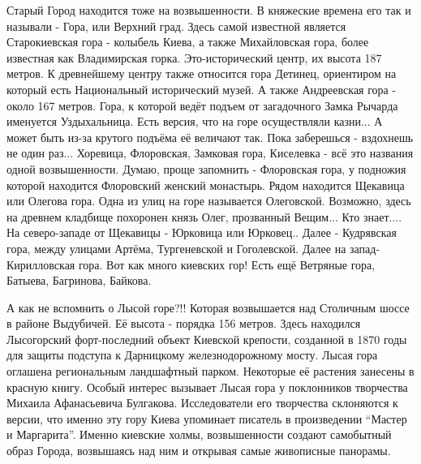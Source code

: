 




Старый Город находится тоже на возвышенности. В
княжеские времена его так и называли - Гора, или Верхний град. Здесь самой
известной является Старокиевская гора - колыбель Киева, а также Михайловская
гора, более известная как Владимирская горка. Это-исторический центр, их высота
187 метров. К древнейшему центру также относится гора Детинец, ориентиром на
который есть Национальный исторический музей. А также Андреевская гора - около 167
метров. Гора, к которой ведёт подъем от загадочного Замка Рычарда именуется
Уздыхальница. Есть версия, что на горе осуществляли казни... А может быть из-за
крутого подъёма её величают так. Пока заберешься - вздохнешь не один
раз... Хоревица, Флоровская, Замковая гора, Киселевка - всё это названия одной
возвышенности. Думаю, проще запомнить - Флоровская гора, у подножия которой
находится Флоровский  женский монастырь. Рядом находится Щекавица или Олегова
гора. Одна из улиц на горе называется Олеговской. Возможно, здесь на древнем
кладбище похоронен князь Олег, прозванный Вещим... Кто знает.... На северо-западе
от Щекавицы - Юрковица или Юрковец.. Далее - Кудрявская гора, между улицами
Артёма, Тургеневской и Гоголевской. Далее на запад-Кирилловская гора. Вот как
много киевских гор! Есть ещё Ветряные гора, Батыева, Багринова, Байкова. 

А как не вспомнить о Лысой горе?!! Которая возвышается над Столичным шоссе в
районе Выдубичей. Её высота - порядка 156 метров. Здесь находился Лысогорский
форт-последний объект Киевской крепости, созданной в 1870 годы для защиты
подступа к Дарницкому железнодорожному мосту. Лысая гора оглашена региональным
ландшафтный парком. Некоторые её растения занесены в красную книгу. Особый
интерес вызывает Лысая гора у поклонников творчества Михаила Афанасьевича
Булгакова. Исследователи его творчества склоняются к версии, что именно эту
гору Киева упоминает писатель в произведении \enquote{Мастер и Маргарита}. Именно
киевские холмы, возвышенности создают самобытный образ Города, возвышаясь над
ним и открывая самые живописные панорамы. 

